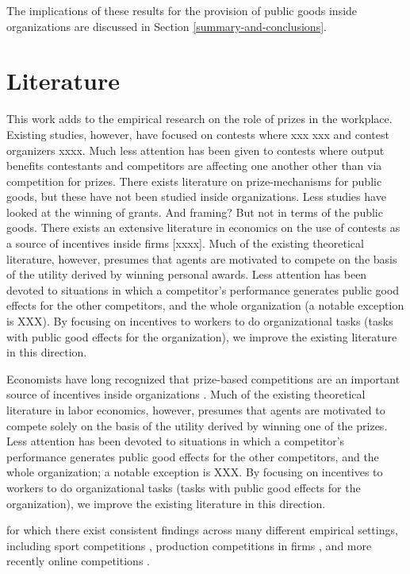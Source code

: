 \documentclass[11pt, titlepage]{article}
\begin{document}
The implications of these results for the provision of public goods
inside organizations are discussed in Section
\ref{summary-and-conclusions}.

\section{Literature}\label{literature}

This work adds to the empirical research on the role of prizes in the
workplace. Existing studies, however, have focused on contests where xxx
xxx and contest organizers xxxx. Much less attention has been given to
contests where output benefits contestants and competitors are affecting
one another other than via competition for prizes. There exists
literature on prize-mechanisms for public goods, but these have not been
studied inside organizations. Less studies have looked at the winning of
grants. And framing? But not in terms of the public goods. There exists
an extensive literature in economics on the use of contests as a source
of incentives inside firms {[}xxxx{]}. Much of the existing theoretical
literature, however, presumes that agents are motivated to compete on
the basis of the utility derived by winning personal awards. Less
attention has been devoted to situations in which a competitor's
performance generates public good effects for the other competitors, and
the whole organization (a notable exception is XXX). By focusing on
incentives to workers to do organizational tasks (tasks with public good
effects for the organization), we improve the existing literature in
this direction.

Economists have long recognized that prize-based competitions are an
important source of incentives inside organizations
\citep{lazear1981rank, green1983comparison, nalebuff1983prizes, mary1984economic}.
Much of the existing theoretical literature in labor economics, however,
presumes that agents are motivated to compete solely on the basis of the
utility derived by winning one of the prizes. Less attention has been
devoted to situations in which a competitor's performance generates
public good effects for the other competitors, and the whole
organization; a notable exception is XXX. By focusing on incentives to
workers to do organizational tasks (tasks with public good effects for
the organization), we improve the existing literature in this direction.

for which there exist consistent findings across many different
empirical settings, including sport competitions
\citep{ehrenberg1990tournaments}, production competitions in firms
\citep{knoeber1994testing, terwiesch2008innovation}, and more recently
online competitions
\citep{boudreau2011incentives, boudreau2016performance}.
\end{document}
